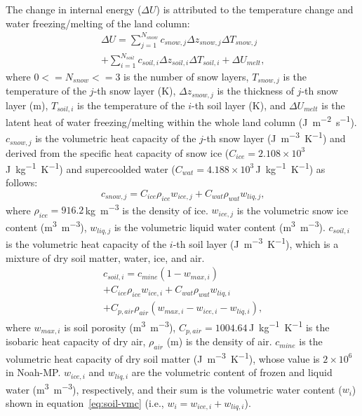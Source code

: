 \documentclass[essd]{copernicus}
\begin{document}
The change in internal energy (\(\Delta U\)) is attributed to the temperature
change and water freezing/melting of the land column:
\begin{multline}
  \Delta U = \sum_{j=1}^{N_{snow}} c_{snow,j}
  \Delta z_{snow,j} \Delta T_{snow,j} \\
  + \sum_{i=1}^{N_{soil}} c_{soil,i} \Delta z_{soil,i} \Delta T_{soil,i}
  + \Delta U_{melt} \text{,}
\end{multline}
where \(0<=N_{snow}<=3\) is the number of snow layers, \(T_{snow,j}\) is the
temperature of the \(j\)-th snow layer (K), \(\Delta z_{snow,j}\) is the
thickness of \(j\)-th snow layer (m), \(T_{soil,i}\) is the temperature of the
\(i\)-th soil layer (K), and \(\Delta U_{melt}\) is the latent heat of water
freezing/melting within the whole land column (\si{J~m^{-2}~s^{-1}}).
\(c_{snow,j}\) is the volumetric heat capacity of the \(j\)-th snow layer
(\si{J~m^{-3}~K^{-1}}) and derived from the specific heat capacity of snow ice
(\(C_{ice} = 2.108 \times 10^3\)\,\si{J~kg^{-1}~K^{-1}}) and supercoolded water
(\(C_{wat} = 4.188 \times 10^3\)\,\si{J~kg^{-1}~K^{-1}}) as follows:
\begin{equation}
  c_{snow,j} = C_{ice} \rho_{ice} w_{ice,j}
  + C_{wat} \rho_{wat} w_{liq,j} \text{,}
\end{equation}
where \(\rho_{ice} = 916.2\)\,\si{kg~m^{-3}} is the density of ice. $w_{ice,j}$
is the volumetric snow ice content (\si{m^3~m^{-3}}), \(w_{liq,j}\) is the
volumetric liquid water content (\si{m^3~m^{-3}}). \(c_{soil,i}\) is the
volumetric heat capacity of the \(i\)-th soil layer (\si{J~m^{-3}~K^{-1}}),
which is a mixture of dry soil matter, water, ice, and air.
\begin{multline}
  c_{soil,i} = c_{mine} (1 - w_{max,i}) \\
  + C_{ice} \rho_{ice} w_{ice,i} + C_{wat} \rho_{wat} w_{liq,i} \\
  + C_{p,air} \rho_{air} (w_{max,i} - w_{ice,i} - w_{liq,i}) \text{,}
\end{multline}
where \(w_{max,i}\) is soil porosity (\si{m^3~m^{-3}}), $C_{p,air} =
1004.64$\,\si{J~kg^{-1}~K^{-1}} is the isobaric heat capacity of dry air,
\(\rho_{air}\) (\si{m}) is the density of air. \(c_{mine}\) is the volumetric
heat capacity of dry soil matter (\si{J~m^{-3}~K^{-1}}), whose value is
\(2\times10^6\) in Noah-MP. \(w_{ice,i}\) and \(w_{liq,i}\) are the volumetric
content of frozen and liquid water (\si{m^3~m^{-3}}), respectively, and their
sum is the volumetric water content (\(w_{i}\)) shown in
equation~\eqref{eq:soil-vmc} (i.e., \(w_{i} = w_{ice,i} + w_{liq,i}\)).
\end{document}
